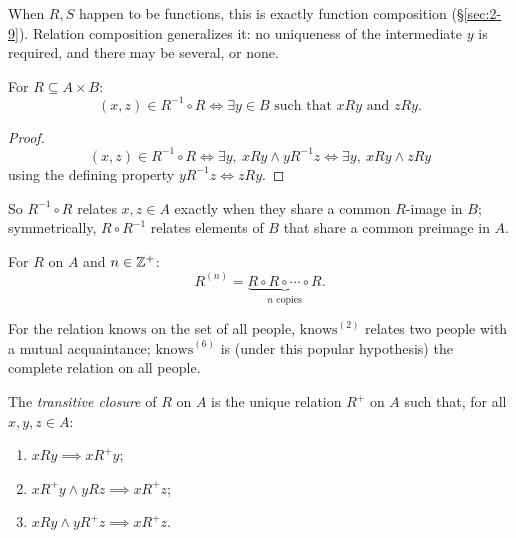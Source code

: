 \documentclass[11pt]{article}
\begin{document}
\begin{note}
When $R,S$ happen to be functions, this is exactly function composition (\S\ref{sec:2-9}). Relation composition generalizes it: no uniqueness of the intermediate $y$ is required, and there may be several, or none.
\end{note}

\begin{theorem}
For $R \subseteq A \times B$:
\[
(x,z) \in R^{-1} \circ R \iff \exists y \in B \text{ such that } xRy \text{ and } zRy.
\]
\end{theorem}
\begin{proof}
\[
(x,z) \in R^{-1}\circ R \iff \exists y,\ xRy \wedge yR^{-1}z \iff \exists y,\ xRy \wedge zRy
\]
using the defining property $yR^{-1}z \iff zRy$.
\end{proof}

\begin{note}
So $R^{-1}\circ R$ relates $x,z \in A$ exactly when they share a common $R$-image in $B$; symmetrically, $R \circ R^{-1}$ relates elements of $B$ that share a common preimage in $A$.
\end{note}

\begin{definition}
For $R$ on $A$ and $n \in \mathbb{Z}^+$:
\[
R^{(n)} = \underbrace{R \circ R \circ \cdots \circ R}_{n \text{ copies}}.
\]
\end{definition}

\begin{example}
For the relation $\mathrm{knows}$ on the set of all people, $\mathrm{knows}^{(2)}$ relates two people with a mutual acquaintance; $\mathrm{knows}^{(6)}$ is (under this popular hypothesis) the complete relation on all people.
\end{example}

\begin{definition}
The \emph{transitive closure} of $R$ on $A$ is the unique relation $R^+$ on $A$ such that, for all $x,y,z \in A$:
\begin{enumerate}[label=(\roman*)]
    \item $xRy \implies xR^+y$;
    \item $xR^+y \wedge yRz \implies xR^+z$;
    \item $xRy \wedge yR^+z \implies xR^+z$.
\end{enumerate}
\end{definition}
\end{document}
